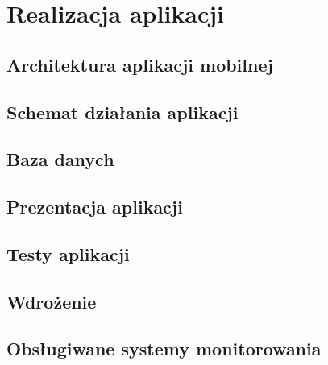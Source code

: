 \chapter[Realizacja aplikacji.]{Realizacja aplikacji}

\section{Architektura aplikacji mobilnej}

\section{Schemat działania aplikacji}

\section{Baza danych}

\section{Prezentacja aplikacji}

\section{Testy aplikacji}

\section{Wdrożenie}

\section{Obsługiwane systemy monitorowania}